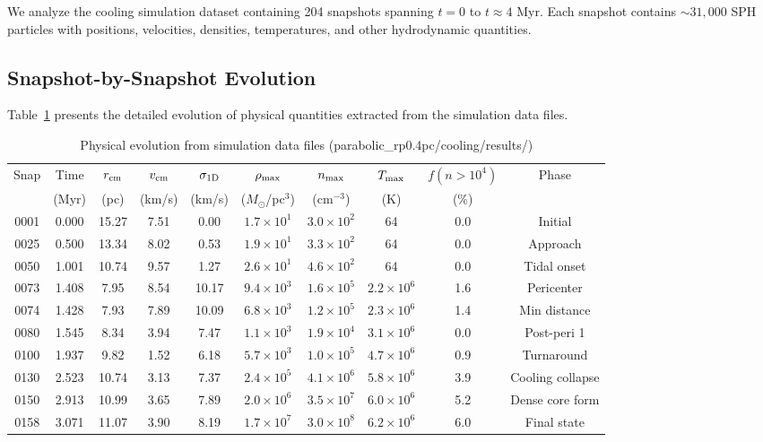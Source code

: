 \documentclass[twocolumn,amsmath,amssymb,prd,superscriptaddress,nofootinbib]{revtex4-2}
\begin{document}
We analyze the cooling simulation dataset containing 204 snapshots spanning $t = 0$ to $t \approx 4$ Myr. Each snapshot contains $\sim 31,000$ SPH particles with positions, velocities, densities, temperatures, and other hydrodynamic quantities.

\subsection{Snapshot-by-Snapshot Evolution}
\label{sec:snapshot_evolution}

Table~\ref{tab:snapshot_evolution} presents the detailed evolution of physical quantities extracted from the simulation data files.

\begin{table}[t]
\centering
\caption{Physical evolution from simulation data files (parabolic\_rp0.4pc/cooling/results/)}
\label{tab:snapshot_evolution}
\begin{tabular}{cccccccccc}
\toprule
Snap & Time & $r_{\rm cm}$ & $v_{\rm cm}$ & $\sigma_{\rm 1D}$ & $\rho_{\rm max}$ & $n_{\rm max}$ & $T_{\rm max}$ & $f(n>10^4)$ & Phase \\
 & (Myr) & (pc) & (km/s) & (km/s) & ($M_\odot$/pc$^3$) & (cm$^{-3}$) & (K) & (\%) & \\
\midrule
0001 & 0.000 & 15.27 & 7.51 & 0.00 & $1.7\times 10^{1}$ & $3.0\times 10^{2}$ & 64 & 0.0 & Initial \\
0025 & 0.500 & 13.34 & 8.02 & 0.53 & $1.9\times 10^{1}$ & $3.3\times 10^{2}$ & 64 & 0.0 & Approach \\
0050 & 1.001 & 10.74 & 9.57 & 1.27 & $2.6\times 10^{1}$ & $4.6\times 10^{2}$ & 64 & 0.0 & Tidal onset \\
0073 & 1.408 & 7.95 & 8.54 & 10.17 & $9.4\times 10^{3}$ & $1.6\times 10^{5}$ & $2.2\times 10^{6}$ & 1.6 & Pericenter \\
0074 & 1.428 & 7.93 & 7.89 & 10.09 & $6.8\times 10^{3}$ & $1.2\times 10^{5}$ & $2.3\times 10^{6}$ & 1.4 & Min distance \\
0080 & 1.545 & 8.34 & 3.94 & 7.47 & $1.1\times 10^{3}$ & $1.9\times 10^{4}$ & $3.1\times 10^{6}$ & 0.0 & Post-peri 1 \\
0100 & 1.937 & 9.82 & 1.52 & 6.18 & $5.7\times 10^{3}$ & $1.0\times 10^{5}$ & $4.7\times 10^{6}$ & 0.9 & Turnaround \\
0130 & 2.523 & 10.74 & 3.13 & 7.37 & $2.4\times 10^{5}$ & $4.1\times 10^{6}$ & $5.8\times 10^{6}$ & 3.9 & Cooling collapse \\
0150 & 2.913 & 10.99 & 3.65 & 7.89 & $2.0\times 10^{6}$ & $3.5\times 10^{7}$ & $6.0\times 10^{6}$ & 5.2 & Dense core form \\
0158 & 3.071 & 11.07 & 3.90 & 8.19 & $1.7\times 10^{7}$ & $3.0\times 10^{8}$ & $6.2\times 10^{6}$ & 6.0 & Final state \\
\bottomrule
\end{tabular}
\end{table}
\end{document}
